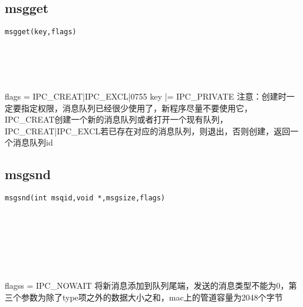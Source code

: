 \documentclass[10pt,a4paper]{article}
\begin{document}
\section{\color[rgb]{0.2,0.4,0.6}{消息队列}}
\subsection{msgget}
\begin{spacing}{2.0}
\lstset{language=C,numbers=none}
\begin{lstlisting}
msgget(key,flags)
\end{lstlisting}
{\large\color[rgb]{0.2,0.4,0.6}{key:}} \\
{\large\color[rgb]{0.2,0.4,0.6}{flags:}}
\paragraph{ \ \ }flags = IPC\_CREAT|IPC\_EXCL|0755 key |= IPC\_PRIVATE 注意：创建时一定要指定权限，消息队列已经很少使用了，新程序尽量不要使用它，IPC\_CREAT创建一个新的消息队列或者打开一个现有队列，IPC\_CREAT|IPC\_EXCL若已存在对应的消息队列，则退出，否则创建，返回一个消息队列id
\end{spacing}

\subsection{msgsnd}
\begin{spacing}{2.0}
\lstset{language=C,numbers=none}
\begin{lstlisting}
msgsnd(int msqid,void *,msgsize,flags)
\end{lstlisting}
{\large\color[rgb]{0.2,0.4,0.6}{msqid:}} \\
{\large\color[rgb]{0.2,0.4,0.6}{*:}} \\
{\large\color[rgb]{0.2,0.4,0.6}{msgsize:}} \\
{\large\color[rgb]{0.2,0.4,0.6}{flags:}}
\paragraph{ \ \ }flagss = IPC\_NOWAIT 将新消息添加到队列尾端，发送的消息类型不能为0，第三个参数为除了type项之外的数据大小之和，mac上的管道容量为2048个字节
\end{spacing}
\end{document}
